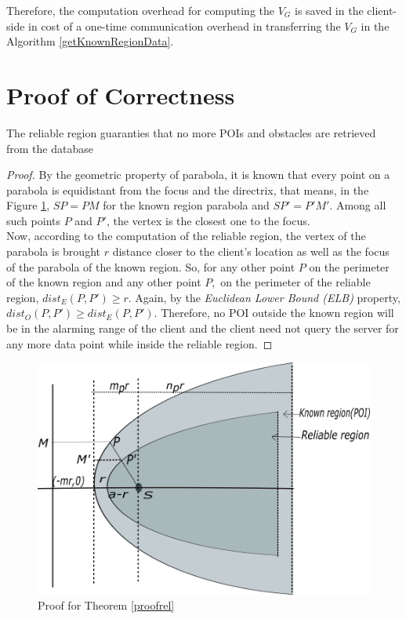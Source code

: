 Therefore, the computation overhead for computing the $V_G$ is saved in the client-side in cost of a one-time communication overhead in transferring the $V_G$ in the Algorithm \ref{getKnownRegionData}.\\

\section{Proof of Correctness}
\label{ProofCort}
\begin{theorem}
\label{proofrel}
The reliable region guaranties that no more POIs and obstacles are retrieved from the database
\end{theorem}

\begin{proof}
By the geometric property of parabola, it is known that every point on a parabola is equidistant from the focus and the directrix, that means, in the Figure \ref{fig:proof}, $SP=PM$ for the known region parabola and $SP'=P'M'$. Among all such points $P$ and $P'$, the vertex is the closest one to the focus.\\
Now, according to the computation of the reliable region, the vertex of the parabola is brought $r$ distance closer to the client's location as well as the focus of the parabola of the known region. So, for any other point $P$ on the perimeter of the known region and any other point $P,$ on the perimeter of the reliable region, $dist_E(P, P') \geq r$. 
Again, by the \textit{Euclidean Lower Bound (ELB)} property, $dist_O(P, P') \geq dist_E(P, P')$. Therefore, no POI outside the known region will be in the alarming range of the client and the client need not query the server for any more data point while inside the reliable region.
\end{proof} 

\begin{figure}[h]
  \includegraphics[width=\linewidth]{proof1.png}
  \caption{Proof for Theorem \ref{proofrel} }
  \label{fig:proof}
\end{figure}


